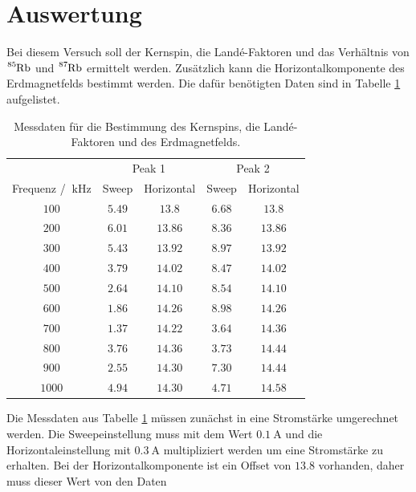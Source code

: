 \section{Auswertung}
\label{sec:Auswertung}
Bei diesem Versuch soll der Kernspin, die Landé-Faktoren und das Verhältnis von $\ce{^85Rb}$ und $\ce{^87Rb}$ ermittelt 
werden. Zusätzlich kann die Horizontalkomponente des Erdmagnetfelds bestimmt werden. Die dafür benötigten Daten sind in 
Tabelle \ref{tab:Messdaten_roh} aufgelistet.
\FloatBarrier
\begin{table}
  \centering
  \caption{Messdaten für die Bestimmung des Kernspins, die Landé-Faktoren und des Erdmagnetfelds.}
  \label{tab:Messdaten_roh}
  \begin{tabular}{c c c c c}
    \toprule
    &\multicolumn{2}{c}{Peak 1}&\multicolumn{2}{c}{Peak 2}\\
    \cmidrule(lr){2-3}\cmidrule(lr){4-5}
    Frequenz / $\SI{}{\kilo\hertz}$&Sweep&Horizontal&Sweep&Horizontal\\
    \midrule
    $\num{100}$&$\num{5.49}$ &$\num{13.8}$ &$\num{6.68}$&$\num{13.8}$\\
    $\num{200}$&$\num{6.01}$ &$\num{13.86}$&$\num{8.36}$&$\num{13.86}$\\
    $\num{300}$&$\num{5.43}$ &$\num{13.92}$&$\num{8.97}$&$\num{13.92}$\\
    $\num{400}$&$\num{3.79}$ &$\num{14.02}$&$\num{8.47}$&$\num{14.02}$\\
    $\num{500}$&$\num{2.64}$ &$\num{14.10}$&$\num{8.54}$&$\num{14.10}$\\
    $\num{600}$&$\num{1.86}$ &$\num{14.26}$&$\num{8.98}$&$\num{14.26}$\\
    $\num{700}$&$\num{1.37}$ &$\num{14.22}$&$\num{3.64}$&$\num{14.36}$\\
    $\num{800}$&$\num{3.76}$ &$\num{14.36}$&$\num{3.73}$&$\num{14.44}$\\
    $\num{900}$&$\num{2.55}$ &$\num{14.30}$&$\num{7.30}$&$\num{14.44}$\\
    $\num{1000}$&$\num{4.94}$&$\num{14.30}$&$\num{4.71}$&$\num{14.58}$\\
    \bottomrule
  \end{tabular}
\end{table} 
\FloatBarrier
Die Messdaten aus Tabelle \ref{tab:Messdaten_roh} müssen zunächst in eine Stromstärke umgerechnet werden. Die Sweepeinstellung 
muss mit dem Wert $\SI{0.1}{\ampere}$ und die Horizontaleinstellung mit $\SI{0.3}{\ampere}$ multipliziert werden um eine Stromstärke
zu erhalten. Bei der Horizontalkomponente ist ein Offset von $\num{13.8}$ vorhanden, daher muss dieser Wert von den Daten 
